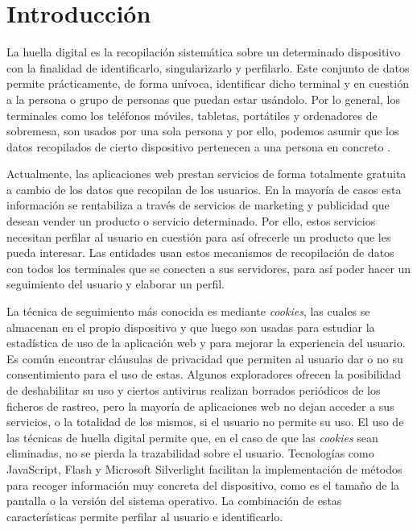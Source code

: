 \chapter{Introducción}

La huella digital es la recopilación sistemática sobre un determinado dispositivo con la finalidad de identificarlo, singularizarlo y perfilarlo. Este conjunto de datos permite prácticamente, de forma unívoca, identificar dicho terminal y en cuestión a la persona o grupo de personas que puedan estar usándolo. Por lo general, los terminales como los teléfonos móviles, tabletas, portátiles y ordenadores de sobremesa, son usados por una sola persona y por ello, podemos asumir que los datos recopilados de cierto dispositivo pertenecen a una persona en concreto \cite{Huella}.\par

Actualmente, las aplicaciones web prestan servicios de forma totalmente gratuita a cambio de los datos que recopilan de los usuarios. En la mayoría de casos esta información se rentabiliza a través de servicios de marketing y publicidad que desean vender un producto o servicio determinado. Por ello, estos servicios necesitan perfilar al usuario en cuestión para así ofrecerle un producto que les pueda interesar. Las entidades usan estos mecanismos de recopilación de datos con todos los terminales que se conecten a sus servidores, para así poder hacer un seguimiento del usuario y elaborar un perfil.\par

La técnica de seguimiento más conocida es mediante \textit{cookies}, las cuales se almacenan en el propio dispositivo y que luego son usadas para estudiar la estadística de uso de la aplicación web y para mejorar la experiencia del usuario. Es común encontrar cláusulas de privacidad que permiten al usuario dar o no su consentimiento para el uso de estas. Algunos exploradores ofrecen la posibilidad de deshabilitar su uso y ciertos antivirus realizan borrados periódicos de los ficheros de rastreo, pero la mayoría de aplicaciones web no dejan acceder a sus servicios, o la totalidad de los mismos, si el usuario no permite su uso. El uso de las técnicas de huella digital permite que, en el caso de que las \textit{cookies} sean eliminadas, no se pierda la trazabilidad sobre el usuario. Tecnologías como JavaScript, Flash y Microsoft Silverlight facilitan la implementación de métodos para recoger información muy concreta del dispositivo, como es el tamaño de la pantalla o la versión del sistema operativo. La combinación de estas características permite perfilar al usuario e identificarlo.  \par

